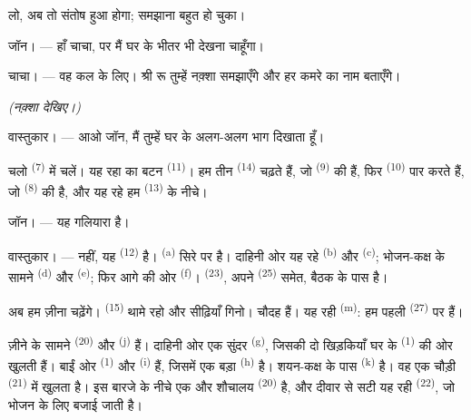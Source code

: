 लो, अब तो संतोष हुआ होगा; समझाना बहुत हो चुका।

\textsc{जॉन}। --- हाँ चाचा, पर मैं घर के भीतर भी देखना चाहूँगा।

\textsc{चाचा}। --- वह कल के लिए। श्री रू तुम्हें नक़्शा समझाएँगे और हर कमरे का
नाम बताएँगे।

\VUsaut{3.0mm}
\VUsaut{2.4mm}

{\centering\textit{(नक़्शा देखिए।)}\par}
\VUsaut{2.4mm}

\textsc{वास्तुकार}। --- आओ जॉन, मैं तुम्हें घर के अलग-अलग भाग दिखाता हूँ।

चलो  \textsuperscript{(7)} में चलें। यह रहा  का बटन
\textsuperscript{(11)}। हम तीन  \textsuperscript{(14)} चढ़ते हैं, जो
 \textsuperscript{(9)} की हैं, फिर 
\textsuperscript{(10)} पार करते हैं, जो 
\textsuperscript{(8)} की है, और यह
रहे हम  \textsuperscript{(13)} के नीचे।

\textsc{जॉन}। --- यह गलियारा है।

\textsc{वास्तुकार}। --- नहीं, यह  \textsuperscript{(12)} है।
 \textsuperscript{(a)} सिरे पर है। दाहिनी ओर यह रहे
 \textsuperscript{(b)} और  \textsuperscript{(c)};
भोजन-कक्ष के सामने  \textsuperscript{(d)} और 
\textsuperscript{(e)}; फिर आगे की ओर  \textsuperscript{(f)}।
 \textsuperscript{(23)}, अपने 
\textsuperscript{(25)} समेत, बैठक के पास है।

अब हम ज़ीना चढ़ेंगे।  \textsuperscript{(15)} थामे रहो और सीढ़ियाँ
गिनो। चौदह हैं। यह रही  \textsuperscript{(m)}: हम पहली
 \textsuperscript{(27)} पर हैं।

\VUsaut{3.0mm}
\VUsaut{3.0mm}

ज़ीने के सामने  \textsuperscript{(20)} और 
\textsuperscript{(j)} हैं। दाहिनी ओर एक सुंदर 
\textsuperscript{(g)}, जिसकी दो खिड़कियाँ घर के  \textsuperscript{(1)}
की ओर खुलती हैं। बाईं ओर  \textsuperscript{(1)} और
 \textsuperscript{(i)} हैं, जिसमें एक बड़ा 
\textsuperscript{(h)} है। शयन-कक्ष के पास 
\textsuperscript{(k)} है। वह एक चौड़ी  \textsuperscript{(21)} में
खुलता है। इस बारजे के नीचे एक और शौचालय \textsuperscript{(20)} है, और दीवार से
सटी यह रही  \textsuperscript{(22)}, जो भोजन के लिए बजाई जाती है।

